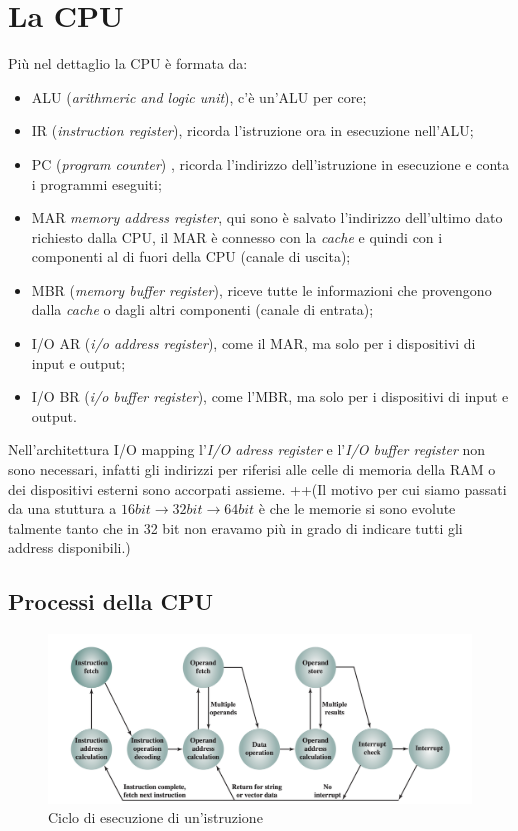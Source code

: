 \documentclass{article}
\begin{document}
\section{La CPU}
Più nel dettaglio la CPU è formata da:
\begin{itemize}
	\item ALU (\textit{arithmeric and logic unit}), c'è un'ALU per core;
	\item IR (\textit{instruction register}), ricorda l'istruzione ora in esecuzione nell'ALU;
	\item PC (\textit{program counter}) \label{programcounter}, ricorda l'indirizzo dell'istruzione in esecuzione e conta i programmi eseguiti;
	\item MAR \textit{memory address register}, qui sono è salvato l'indirizzo dell'ultimo dato richiesto dalla CPU, il MAR è connesso con la \textit{cache} e quindi con i componenti al di fuori della CPU (canale di uscita);
	\item MBR (\textit{memory buffer register}), riceve tutte le informazioni che provengono dalla \textit{cache} o dagli altri componenti (canale di entrata);
	\item I/O AR (\textit{i/o address register}), come il MAR, ma solo per i dispositivi di input e output;
	\item I/O BR (\textit{i/o buffer register}), come l'MBR, ma solo per i dispositivi di input e output.
\end{itemize}

Nell'architettura I/O mapping l'\textit{I/O adress register} e l'\textit{I/O buffer register} non sono necessari, infatti gli indirizzi per riferisi alle celle di memoria della RAM o dei dispositivi esterni sono accorpati assieme. ++(Il motivo per cui siamo passati da una stuttura a $16 bit \rightarrow 32 bit \rightarrow 64 bit$ è che le memorie si sono evolute talmente tanto che in 32 bit non eravamo più in grado di indicare tutti gli address disponibili.)

\subsection{Processi della CPU}
\label{cicloistruzione}

\begin{figure}[h]
	\centering
	\includegraphics[scale=0.3]{immagini/cicloistruzioni}
	\caption{Ciclo di esecuzione di un'istruzione}
\end{figure}
\end{document}
